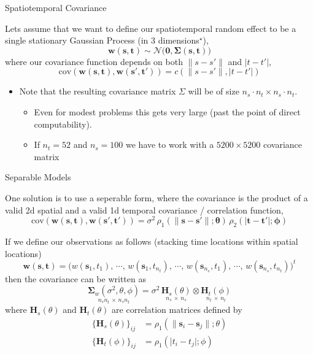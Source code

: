 \documentclass[11pt,ignorenonframetext,]{beamer}
\begin{document}
\begin{frame}{Spatiotemporal Covariance}
\protect\hypertarget{spatiotemporal-covariance}{}

Lets assume that we want to define our spatiotemporal random effect to
be a single stationary Gaussian Process (in 3 dimensions\(^\star\)), \[ 
\symbf{w}(\symbf{s},\symbf{t}) \sim \mathcal{N}\big(\symbf{0}, \symbf{\Sigma}(\symbf{s},\symbf{t})\big) 
\] where our covariance function depends on both \(\lVert s-s'\rVert\)
and \(\lvert t-t'\rvert\), \[
\text{cov}(\symbf{w}(\symbf{s},\symbf{t}), \symbf{w}(\symbf{s}',\symbf{t}')) = c(\lVert s-s'\rVert, \lvert t-t'\rvert)
\]

\begin{itemize}
\item
  Note that the resulting covariance matrix \(\Sigma\) will be of size
  \(n_s \cdot n_t \times n_s \cdot n_t\).

  \begin{itemize}
  \item
    Even for modest problems this gets very large (past the point of
    direct computability).
  \item
    If \(n_t = 52\) and \(n_s = 100\) we have to work with a
    \(5200 \times 5200\) covariance matrix
  \end{itemize}
\end{itemize}

\end{frame}

\begin{frame}{Separable Models}
\protect\hypertarget{separable-models}{}

One solution is to use a seperable form, where the covariance is the
product of a valid 2d spatial and a valid 1d temporal covariance /
correlation function, \[
\text{cov}(\symbf{w}(\symbf{s},\symbf{t}), \symbf{w}(\symbf{s}',\symbf{t}')) = \sigma^2 \, \rho_1(\lVert \symbf{s}-\symbf{s}'\rVert;\symbf{\theta}) \, \rho_2(\lvert \symbf{t}-\symbf{t}' \rvert; \symbf{\phi})
\]

\pause

If we define our observations as follows (stacking time locations within
spatial locations) \[
\symbf{w}(\symbf{s},\symbf{t}) = \big(
  w(\symbf{s}_1,t_1)     ,\, \cdots ,\, w(\symbf{s}_1,t_{n_t}) ,\,
  \cdots ,\,
  w(\symbf{s}_{n_s},t_1) ,\, \cdots ,\, w(\symbf{s}_{n_s},t_{n_t}) \big)^t
\] \normalsize then the covariance can be written as \[
\underset{n_s n_t \,\times\, n_s n_t}{\symbf{\Sigma}_w(\sigma^2, \theta, \phi)} = \sigma^2 \, \underset{n_s \,\times\, n_s}{\symbf{H}_s(\theta)} \otimes \underset{n_t \,\times\, n_t}{\symbf{H}_t(\phi)}
\] where \(\symbf{H}_s(\theta)\) and \(\symbf{H}_t(\theta)\) are
correlation matrices defined by \footnotesize \[
\begin{aligned}
\{\symbf{H}_s(\theta)\}_{ij} &= \rho_1(\lVert \symbf{s}_i - \symbf{s}_j \rVert; \theta) \\
\{\symbf{H}_t(\phi)\}_{ij} &= \rho_1(\lvert t_i - t_j \rvert; \phi) \\
\end{aligned}
\]

\end{frame}
\end{document}
